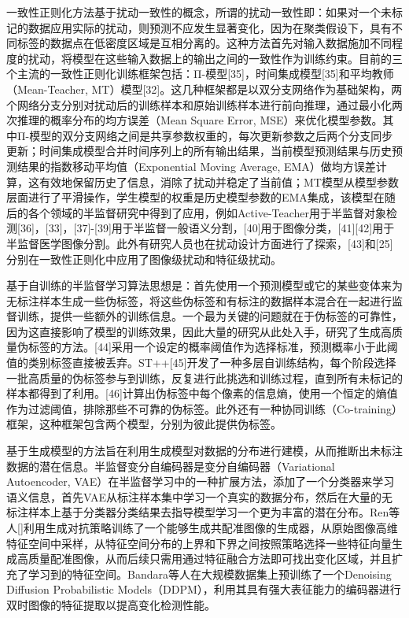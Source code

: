 \documentclass[lang=chs, degree=master, blindreview=false, adobe=false]{yanputhesis}
\begin{document}
一致性正则化方法基于扰动一致性的概念，所谓的扰动一致性即：如果对一个未标记的数据应用实际的扰动，则预测不应发生显著变化，因为在聚类假设下，具有不同标签的数据点在低密度区域是互相分离的。这种方法首先对输入数据施加不同程度的扰动，将模型在这些输入数据上的输出之间的一致性作为训练约束。目前的三个主流的一致性正则化训练框架包括：Π-模型[35]，时间集成模型[35]和平均教师（Mean-Teacher, MT）模型[32]。这几种框架都是以双分支网络作为基础架构，两个网络分支分别对扰动后的训练样本和原始训练样本进行前向推理，通过最小化两次推理的概率分布的均方误差（Mean Square Error, MSE）来优化模型参数。其中Π-模型的双分支网络之间是共享参数权重的，每次更新参数之后两个分支同步更新；时间集成模型合并时间序列上的所有输出结果，当前模型预测结果与历史预测结果的指数移动平均值（Exponential Moving Average, EMA）做均方误差计算，这有效地保留历史了信息，消除了扰动并稳定了当前值；MT模型从模型参数层面进行了平滑操作，学生模型的权重是历史模型参数的EMA集成，该模型在随后的各个领域的半监督研究中得到了应用，例如Active-Teacher用于半监督对象检测[36]，[33]，[37]-[39]用于半监督一般语义分割，[40]用于图像分类，[41][42]用于半监督医学图像分割。此外有研究人员也在扰动设计方面进行了探索，[43]和[25]分别在一致性正则化中应用了图像级扰动和特征级扰动。

基于自训练的半监督学习算法思想是：首先使用一个预测模型或它的某些变体来为无标注样本生成一些伪标签，将这些伪标签和有标注的数据样本混合在一起进行监督训练，提供一些额外的训练信息。一个最为关键的问题就在于伪标签的可靠性，因为这直接影响了模型的训练效果，因此大量的研究从此处入手，研究了生成高质量伪标签的方法。[44]采用一个设定的概率阈值作为选择标准，预测概率小于此阈值的类别标签直接被丢弃。ST++[45]开发了一种多层自训练结构，每个阶段选择一批高质量的伪标签参与到训练，反复进行此挑选和训练过程，直到所有未标记的样本都得到了利用。[46]计算出伪标签中每个像素的信息熵，使用一个恒定的熵值作为过滤阈值，排除那些不可靠的伪标签。此外还有一种协同训练（Co-training）框架\cite{co-training}，这种框架包含两个模型，分别为彼此提供伪标签。

基于生成模型的方法旨在利用生成模型对数据的分布进行建模，从而推断出未标注数据的潜在信息。半监督变分自编码器\cite{semiVAE}是变分自编码器（Variational Autoencoder, VAE）在半监督学习中的一种扩展方法，添加了一个分类器来学习语义信息，首先VAE从标注样本集中学习一个真实的数据分布，然后在大量的无标注样本上基于分类器分类结果去指导模型学习一个更为丰富的潜在分布。Ren等人[]利用生成对抗策略训练了一个能够生成共配准图像的生成器，从原始图像高维特征空间中采样，从特征空间分布的上界和下界之间按照策略选择一些特征向量生成高质量配准图像，从而后续只需用通过特征融合方法即可找出变化区域，并且扩充了学习到的特征空间。Bandara等人在大规模数据集上预训练了一个Denoising
Diffusion Probabilistic Models（DDPM），利用其具有强大表征能力的编码器进行双时图像的特征提取以提高变化检测性能。
\end{document}
